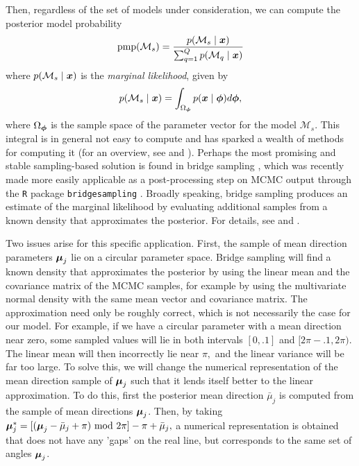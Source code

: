 Then, regardless of the set of models under consideration, we can compute the posterior model probability
\begin{equation}
  \text{pmp}(\mathcal{M}_s) = \frac{p(\mathcal{M}_s \mid \boldsymbol{x})}{\sum_{q = 1}^Q p(\mathcal{M}_q \mid \boldsymbol{x}) }
\end{equation}
where \(p(\mathcal{M}_s \mid \boldsymbol{x})\) is the \textit{marginal likelihood}, given by
\begin{equation}
  p(\mathcal{M}_s \mid \boldsymbol{x}) = \int_{\Omega_{\boldsymbol{\phi}}} p(\boldsymbol{x} \mid \boldsymbol{\phi}) d\boldsymbol{\phi},
\end{equation}
where \(\Omega_{\boldsymbol{\phi}}\) is the sample space of the parameter vector for the model $\mathcal{M}_s$.  This integral is in general not easy to compute and has sparked a wealth of methods for computing it (for an overview, see \citet{ardia2012comparative} and \citet{friel2012estimating}). Perhaps the most promising and stable sampling-based solution is found in bridge sampling \citep{meng1996simulating}, which was recently made more easily applicable as a post-processing step on MCMC output through the \texttt{R} package \texttt{bridgesampling} \citep{gronau2017tutorial}. Broadly speaking, bridge sampling produces an estimate of the marginal likelihood by evaluating additional samples from a known density that approximates the posterior. For details, see \citet{gronau2017tutorial} and \citet{meng1996simulating}.

Two issues arise for this specific application. First, the sample of mean direction parameters \(\boldsymbol{\mu}_j\) lie on a circular parameter space. Bridge sampling will find a known density that approximates the posterior by using the linear mean and the covariance matrix of the MCMC samples, for example by using the multivariate normal density with the same mean vector and covariance matrix. The approximation need only be roughly correct, which is not necessarily the case  for our model. For example, if we have a circular parameter with a mean direction near zero, some sampled values will lie in both intervals \([0, .1]\) and \([2\pi - .1, 2\pi)\). The linear mean will then incorrectly lie near \(\pi,\) and the linear variance will be far too large. To solve this, we will change the numerical representation of the mean direction sample of \(\boldsymbol{\mu}_j\) such that it lends itself better to the linear approximation. To do this, first the posterior mean direction \(\bar{\mu}_j\) is computed from the sample of mean directions \(\boldsymbol{\mu}_j\). Then, by taking \(\boldsymbol{\mu}_j^\ast = [(\boldsymbol{\mu}_j - \bar{\mu}_j + \pi)~ \text{mod} ~ 2\pi ] - \pi + \bar{\mu}_j,\) a numerical representation is obtained that does not have any 'gaps' on the real line, but corresponds to the same set of angles \(\boldsymbol{\mu}_j\).

